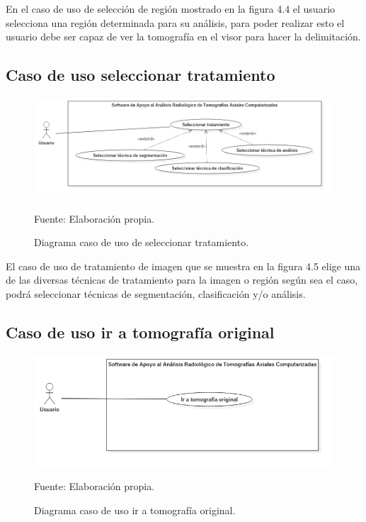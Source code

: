 \documentclass[12pt]{report}
\begin{document}
En el caso de uso de selección de región mostrado en la figura 4.4 el usuario selecciona una región determinada para su análisis, para poder realizar esto el usuario debe ser capaz de ver la tomografía en el visor para hacer la delimitación.

\subsection{Caso de uso seleccionar tratamiento}
\begin{figure}[H]
\centering
\includegraphics[width = 13 cm, height =  10 cm]{TrataCasos}
\caption{Diagrama caso de uso de seleccionar tratamiento.}
Fuente: Elaboración propia.
\end{figure}

El caso de uso de tratamiento de imagen que se muestra en la figura 4.5 elige una de las diversas técnicas de tratamiento para la imagen o región según sea el caso, podrá seleccionar técnicas de segmentación, clasificación y/o análisis.

\subsection{Caso de uso ir a tomografía original}
\begin{figure}[H]
\centering
\includegraphics[width = 9 cm, height =  7 cm]{origi}
\caption{Diagrama caso de uso ir a tomografía original.}
Fuente: Elaboración propia.
\end{figure}
\end{document}

